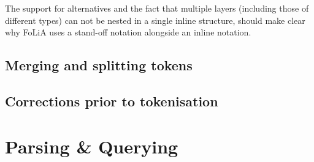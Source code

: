 \documentclass[a4paper,12pt]{report}
\begin{document}
The support for alternatives and the fact that multiple layers (including those of different types) can not be nested in a single inline structure, should make clear why FoLiA uses a stand-off notation alongside an inline notation. 

\section{Merging and splitting tokens}



\section{Corrections prior to tokenisation}



\chapter{Parsing \& Querying}
\end{document}
